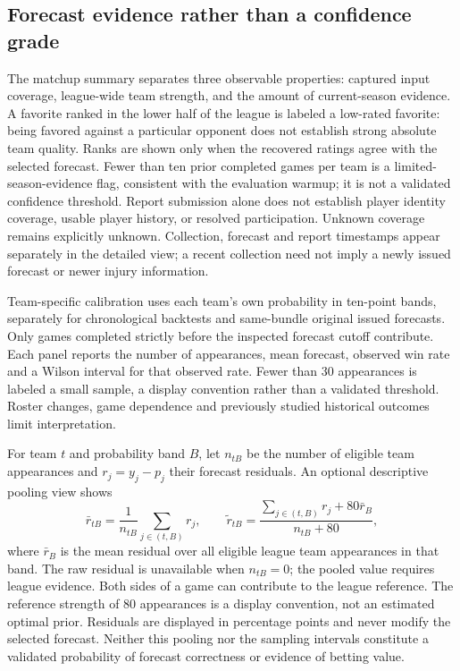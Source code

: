 \documentclass[11pt]{article}
\begin{document}
\subsection{Forecast evidence rather than a confidence grade}
The matchup summary separates three observable properties: captured input
coverage, league-wide team strength, and the amount of current-season
evidence. A favorite ranked in the lower half of the league is labeled a
low-rated favorite: being favored against a particular opponent does not
establish strong absolute team quality. Ranks are shown only when the
recovered ratings agree with the selected forecast. Fewer than ten prior
completed games per team is a limited-season-evidence flag, consistent with
the evaluation warmup; it is not a validated confidence threshold. Report
submission alone does not establish player identity coverage, usable player
history, or resolved participation. Unknown coverage remains explicitly
unknown. Collection, forecast and report timestamps appear separately in
the detailed view; a recent collection need not imply a newly issued
forecast or newer injury information.

Team-specific calibration uses each team's own probability in ten-point
bands, separately for chronological backtests and same-bundle original
issued forecasts. Only games completed strictly before the inspected
forecast cutoff contribute. Each panel reports the number of appearances,
mean forecast, observed win rate and a Wilson interval for that observed
rate. Fewer than 30 appearances is labeled a small sample, a display
convention rather than a validated threshold. Roster changes, game
dependence and previously studied historical outcomes limit interpretation.

For team $t$ and probability band $B$, let $n_{tB}$ be the number of
eligible team appearances and $r_j=y_j-p_j$ their forecast residuals.
An optional descriptive pooling view shows
\[
  \bar r_{tB}=\frac{1}{n_{tB}}\sum_{j\in(t,B)}r_j,
  \qquad
  \widetilde r_{tB}=
  \frac{\sum_{j\in(t,B)}r_j+80\bar r_B}{n_{tB}+80},
\]
where $\bar r_B$ is the mean residual over all eligible league team
appearances in that band. The raw residual is unavailable when
$n_{tB}=0$; the pooled value requires league evidence. Both sides of a game
can contribute to the league reference. The reference strength of 80
appearances is a display convention, not an estimated optimal prior.
Residuals are displayed in percentage points and never modify the selected
forecast. Neither this pooling nor the sampling intervals constitute a
validated probability of forecast correctness or evidence of betting value.
\end{document}
